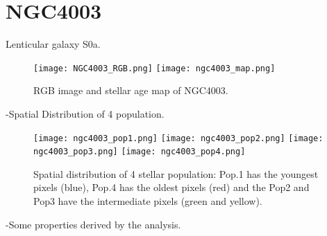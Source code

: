 \newpage
\section*{NGC4003}

Lenticular galaxy S0a.

\begin{figure}[bh]
\begin{center}
\texttt{[image: NGC4003\_RGB.png]}
\texttt{[image: ngc4003\_map.png]}
 \caption{RGB image and stellar age map of NGC4003.}
   \label{fig1}
\end{center}
\end{figure}

-Spatial Distribution of 4 population.


\begin{figure}[bh]
\begin{center}
\texttt{[image: ngc4003\_pop1.png]}
\texttt{[image: ngc4003\_pop2.png]}
\texttt{[image: ngc4003\_pop3.png]}
\texttt{[image: ngc4003\_pop4.png]}
 \caption{Spatial distribution of 4 stellar population: Pop.1 has the youngest pixels (blue), Pop.4 has the oldest pixels (red) and the Pop2 and Pop3 have the intermediate pixels (green and yellow).}
   \label{fig1}
\end{center}
\end{figure}

-Some properties derived by the analysis.

